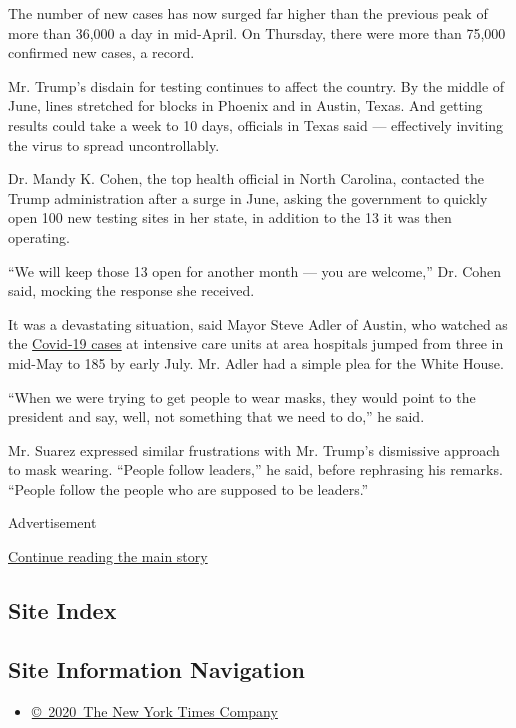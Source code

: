 The number of new cases has now surged far higher than the previous peak
of more than 36,000 a day in mid-April. On Thursday, there were more
than 75,000 confirmed new cases, a record.

Mr. Trump's disdain for testing continues to affect the country. By the
middle of June, lines stretched for blocks in Phoenix and in Austin,
Texas. And getting results could take a week to 10 days, officials in
Texas said --- effectively inviting the virus to spread uncontrollably.

Dr. Mandy K. Cohen, the top health official in North Carolina, contacted
the Trump administration after a surge in June, asking the government to
quickly open 100 new testing sites in her state, in addition to the 13
it was then operating.

``We will keep those 13 open for another month --- you are welcome,''
Dr. Cohen said, mocking the response she received.

It was a devastating situation, said Mayor Steve Adler of Austin, who
watched as the
\href{https://dshs.texas.gov/coronavirus/additionaldata.aspx}{Covid-19
cases} at intensive care units at area hospitals jumped from three in
mid-May to 185 by early July. Mr. Adler had a simple plea for the White
House.

``When we were trying to get people to wear masks, they would point to
the president and say, well, not something that we need to do,'' he
said.

Mr. Suarez expressed similar frustrations with Mr. Trump's dismissive
approach to mask wearing. ``People follow leaders,'' he said, before
rephrasing his remarks. ``People follow the people who are supposed to
be leaders.''

Advertisement

\protect\hyperlink{after-bottom}{Continue reading the main story}

\hypertarget{site-index}{%
\subsection{Site Index}\label{site-index}}

\hypertarget{site-information-navigation}{%
\subsection{Site Information
Navigation}\label{site-information-navigation}}

\begin{itemize}
\tightlist
\item
  \href{https://help.nytimes3xbfgragh.onion/hc/en-us/articles/115014792127-Copyright-notice}{©~2020~The
  New York Times Company}
\end{itemize}

